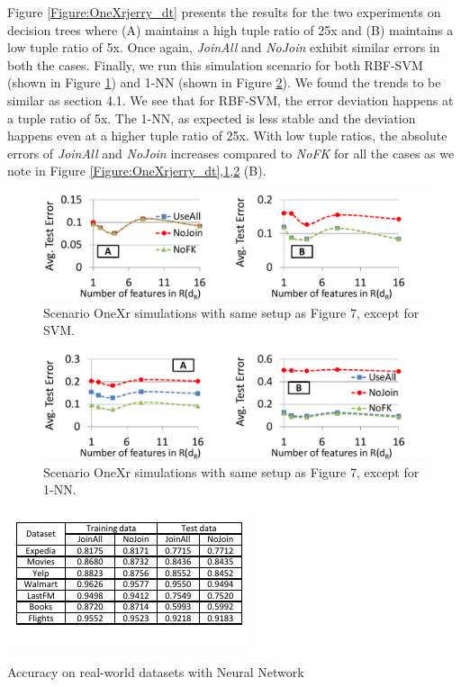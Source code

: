 \documentclass{vldb}
\begin{document}
Figure \ref{Figure:OneXrjerry_dt} presents the results for the two experiments on decision trees where (A) maintains a high tuple ratio of 25x and (B) maintains a low tuple ratio of 5x. Once again, \textit{JoinAll} and \textit{NoJoin} exhibit similar errors in both the cases. Finally, we run this simulation scenario for both RBF-SVM (shown in Figure \ref{Figure:OneXrjerry_svm}) and 1-NN (shown in Figure \ref{Figure:OneXrjerry_1nn}). We found the trends to be similar as section 4.1. We see that for RBF-SVM, the error deviation happens at a tuple ratio of 5x. The 1-NN, as expected is less stable and the deviation happens even at a higher tuple ratio of 25x. With low tuple ratios, the absolute errors of \textit{JoinAll} and \textit{NoJoin} increases compared to \textit{NoFK} for all the cases as we note in Figure \ref{Figure:OneXrjerry_dt},\ref{Figure:OneXrjerry_svm},\ref{Figure:OneXrjerry_1nn} (B).
\begin{figure}[h]
\centering
\includegraphics[width=0.99\linewidth]{onexr_jerrysvm.pdf}
\caption{Scenario OneXr simulations with same setup as Figure 7, except for SVM.}
\label{Figure:OneXrjerry_svm}
\end{figure}
\begin{figure}[h]
\centering
\includegraphics[width=0.99\linewidth]{onexr_jerry1nn.pdf}
\caption{Scenario OneXr simulations with same setup as Figure 7, except for 1-NN.}
\label{Figure:OneXrjerry_1nn}
\end{figure}
\begin{table}[t]
\centering
\includegraphics[width=\columnwidth,height=\textheight,keepaspectratio]{nn_table.pdf}
\caption{Accuracy on real-world datasets with Neural Network}
\label{Table:NeuralNet}
\end{table}
\end{document}
